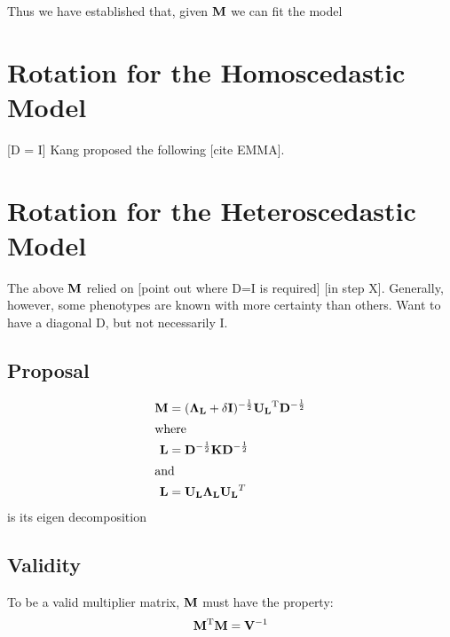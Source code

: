 


Thus we have established that, given $\mathbf{M}$ we can fit the model


\section{Rotation for the Homoscedastic Model}

[D = I]
Kang proposed the following [cite EMMA].




\section{Rotation for the Heteroscedastic Model}

The above $\mathbf{M}$ relied on [point out where D=I is required] [in step X].
Generally, however, some phenotypes are known with more certainty than others.
Want to have a diagonal D, but not necessarily I.

\subsection{Proposal}

\begin{align}
	\mathbf{M} &= (\mathbf{\Lambda_L} + \delta \mathbf{I})^{-\frac{1}{2}}\mathbf{U_L}^\mathrm{T} \mathbf{D}^{-\frac{1}{2}}\\
\intertext{where}
	\mathbf{L} &= \mathbf{D}^{-\frac{1}{2}}\mathbf{K} \mathbf{D}^{-\frac{1}{2}}\\
\intertext{and}
	\mathbf{L} &= \mathbf{U_L} \mathbf{\Lambda_L} \mathbf{U_L}^T
\end{align}
is its eigen decomposition


\subsection{Validity}

To be a valid multiplier matrix, $\mathbf{M}$ must have the property:
\begin{equation}
  \mathbf{M} ^\mathrm{T} \mathbf{M} = \mathbf{V}^{-1}
\end{equation}
	


